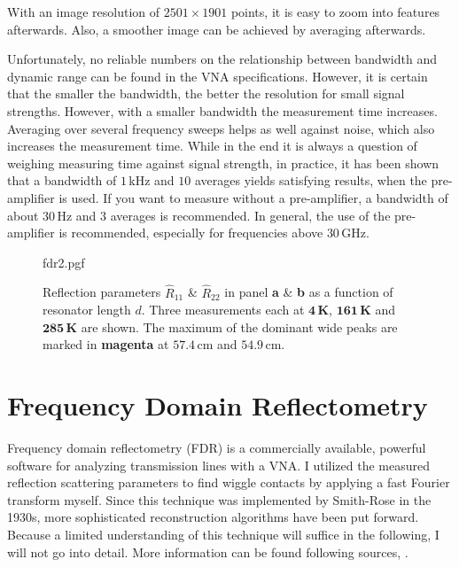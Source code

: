 With an image resolution of $2501\times1901$ points, it is easy to zoom into features afterwards. Also, a smoother image can be achieved by averaging afterwards.

Unfortunately, no reliable numbers on the relationship between bandwidth and dynamic range can be found in the VNA specifications. However, it is certain that the smaller the bandwidth, the better the resolution for small signal strengths. However, with a smaller bandwidth the measurement time increases. Averaging over several frequency sweeps helps as well against noise, which also increases the measurement time. While in the end it is always a question of weighing measuring time against signal strength, in practice, it has been shown that a bandwidth of $1\,$kHz and $10$ averages yields satisfying results, when the pre-amplifier is used. If you want to measure without a pre-amplifier, a bandwidth of about $30\,$Hz and $3$ averages is recommended. In general, the use of the pre-amplifier is recommended, especially for frequencies above $30\,$GHz. \cite{ZNB40manual,ZNB40brochure,ZNB40spec}

\begin{figure}[t]
    \centering
    {fdr2.pgf}
    \caption[Reflection parameters as a function of resonator length]{Reflection parameters $\hat{R}_{11}$ \& $\hat{R}_{22}$ in panel \textbf{\color{antiseeblau100}a} \& \textbf{\color{antiseeblau100}b} as a function of resonator length $d$. Three measurements each at \textbf{\color[rgb]{0.000000,0.404312,0.680182}$\mathbf{4}$\,K}, \textbf{\color[rgb]{0.085109,0.628859,0.828930}$\mathbf{161}$\,K} and \textbf{\color[rgb]{0.499287,0.767565,0.878733}$\mathbf{285}$\,K} are shown. The maximum of the dominant wide peaks are marked in \textbf{\color{antiseeblau100}magenta} at $57.4\,$cm and $54.9\,$cm.}
    \label{fig:analysis_tdr}
\end{figure}

\section{Frequency Domain Reflectometry}

Frequency domain reflectometry (FDR) is a commercially available, powerful software for analyzing transmission lines with a VNA. I utilized the measured reflection scattering parameters to find wiggle contacts by applying a fast Fourier transform myself. Since this technique was implemented by Smith-Rose in the 1930s, more sophisticated reconstruction algorithms have been put forward. Because a limited understanding of this technique will suffice in the following, I will not go into detail. More information can be found following sources, \cite{smithrose1933, vanhamme1990, shin2005, keysightFDR}.

